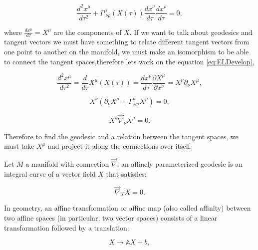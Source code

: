         \begin{equation}
            \frac{d^2 x^{\mu}}{d\tau^2} + \Gamma^{\mu}_{\;\nu\rho}\left(X(\tau) \right)\frac{d x^{\nu}}{d\tau}\frac{d x^{\rho}}{d\tau}=0,
        \end{equation}

        where $\frac{dx^{\mu}}{d\tau}=X^{\mu}$ are the components of $X$. If we want to talk about geodesics and tangent vectors we must have something to relate different tangent vectors from one point to another on the manifold, we must make an isomorphism to be able to connect the tangent spaces,therefore lets work on the equation \ref{eq:ELDevelop},

        \begin{equation}
            \frac{d^2x^{\mu}}{d\tau^2}= \frac{d}{d\tau}X^{\mu}\left(X(\tau)\right) = \frac{d x^{\nu}}{d\tau}\frac{\partial X^{\mu}}{\partial x^{\nu}} = X^{\nu}\partial_{\nu}X^{\mu},
        \end{equation}

         \begin{equation}
             X^{\nu}\left(\partial_{\nu}X^{\mu} + \Gamma^{\mu}_{\;\nu\rho}X^{\rho} \right) = 0,
         \end{equation}

         \begin{equation}
             X^{\nu}\Vec{\nabla}_{\nu}X^{\mu}=0.
         \end{equation}

         Therefore to find the geodesic and a relation between the tangent spaces, we must take $X^{\mu}$ and project it along the connections over itself.

         \begin{myDef}
             Let $M$ a manifold with connection $\Vec{\nabla}$, an affinely parameterized geodesic is an integral curve of a vector field $X$ that satisfies:

             \begin{equation}
                 \Vec{\nabla}_XX=0.
             \end{equation}
         \end{myDef}

         In geometry, an affine transformation or affine map (also called affinity) between two affine spaces (in particular, two vector spaces) consists of a linear transformation followed by a translation:

         \begin{equation}
             X \rightarrow \mathbb{A}X + b,
         \end{equation}


